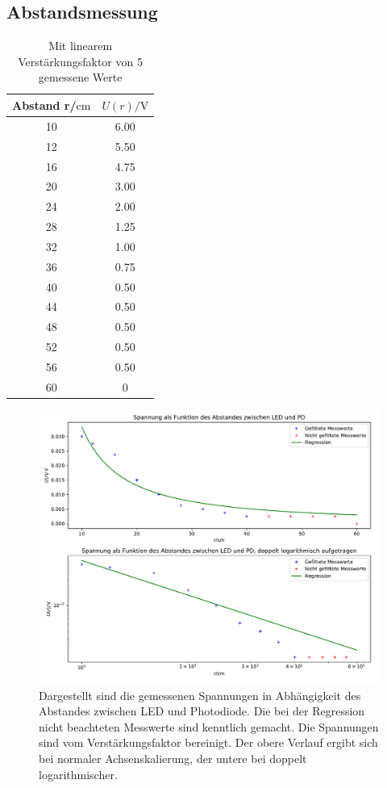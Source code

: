 \subsection{Abstandsmessung}
\label{chapter:Abst}
\begin{table}
  \centering
  \caption{Mit linearem Verstärkungsfaktor von 5 gemessene Werte}
  \label{tab:2}
  \begin{tabular}{c c}
    \toprule
    Abstand r/$\si{\centi\metre}$ & $U(r)/\si{\volt}$\\
    \midrule
    10 & 6.00 \\
    12 & 5.50 \\
    16 & 4.75 \\
    20 & 3.00 \\
    24 & 2.00 \\
    28 & 1.25 \\
    32 & 1.00 \\
    36 & 0.75 \\
    40 & 0.50 \\
    44 & 0.50 \\
    48 & 0.50 \\
    52 & 0.50 \\
    56 & 0.50 \\
    60 & 0 \\
    \bottomrule
  \end{tabular}
\end{table}
\begin{figure}
  \centering
     \includegraphics[scale=0.6]{SubABst.pdf}
  \caption{Dargestellt sind die gemessenen Spannungen in Abhängigkeit des Abstandes zwischen LED und Photodiode. Die bei der Regression nicht
  beachteten Messwerte sind kenntlich gemacht.
  Die Spannungen sind vom Verstärkungsfaktor bereinigt. Der obere Verlauf ergibt sich bei normaler Achsenskalierung,
  der untere bei doppelt logarithmischer.}
  \label{plot:2}
\end{figure}
